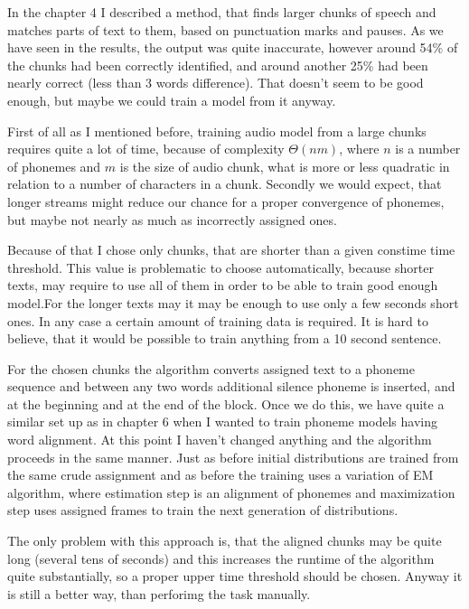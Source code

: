 \documentclass[12pt,a4paper,english]{article}
\begin{document}
In the chapter 4 I described a method, that finds larger chunks of speech and matches parts of text to them, based on punctuation marks and pauses. As we have seen in the results, the output was quite inaccurate, however around 54\% of the chunks had been correctly identified, and around another 25\% had been nearly correct (less than 3 words difference). That doesn't seem to be good enough, but maybe we could train a model from it anyway. \newline

First of all as I mentioned before, training audio model from a large chunks requires quite a lot of time, because of complexity $\Theta(nm)$, where $n$ is a number of phonemes and $m$ is the size of audio chunk, what is more or less quadratic in relation to a number of characters in a chunk. \newline
Secondly we would expect, that longer streams might reduce our chance for a proper convergence of phonemes, but maybe not nearly as much as incorrectly assigned ones. \newline

Because of that I chose only chunks, that are shorter than a given constime time threshold. This value is problematic to choose automatically, because shorter texts, may require to use all of them in order to be able to train good enough model.For the longer texts may it may be enough to use only a few seconds short ones.
In any case a certain amount of training data is required. It is hard to believe, that it would be possible to train anything from a 10 second sentence. \newline

For the chosen chunks the algorithm converts assigned text to a phoneme sequence and between any two words additional silence phoneme is inserted, and at the beginning and at the end of the block. \newline
Once we do this, we have quite a similar set up as in chapter 6 when I wanted to train phoneme models having word alignment. At this point I haven't changed anything and the algorithm proceeds in the same manner. \newline
Just as before initial distributions are trained from the same crude assignment and as before the training uses a variation of EM algorithm, where estimation step is an alignment of phonemes and maximization step uses assigned frames to train the next generation of distributions. \newline

The only problem with this approach is, that the aligned chunks may be quite long (several tens of seconds) and this increases the runtime of the algorithm quite substantially, so a proper upper time threshold should be chosen. Anyway it is still a better way, than perforimg the task manually.
\end{document}
